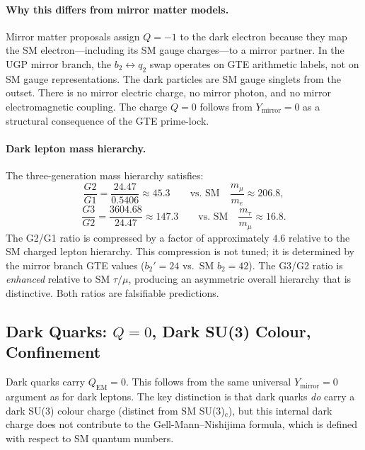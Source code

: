 \documentclass[11pt]{article}
\begin{document}
\paragraph{Why this differs from mirror matter models.}
Mirror matter proposals \cite{FootLewVolkas1991} assign $Q=-1$ to the dark electron
because they map the SM electron---including its SM gauge charges---to a mirror partner.
In the UGP mirror branch, the $b_2 \leftrightarrow q_2$ swap operates on GTE arithmetic
labels, not on SM gauge representations. The dark particles are SM gauge singlets from
the outset. There is no mirror electric charge, no mirror photon, and no mirror
electromagnetic coupling. The charge $Q=0$ follows from $Y_\mathrm{mirror}=0$ as a
structural consequence of the GTE prime-lock.

\paragraph{Dark lepton mass hierarchy.}
The three-generation mass hierarchy satisfies:
\begin{equation}
\frac{G2}{G1} = \frac{24.47}{0.5406} \approx 45.3
\qquad\text{vs.\ SM}\quad \frac{m_\mu}{m_e} \approx 206.8,
\label{eq:mass_ratio_g2g1}
\end{equation}
\begin{equation}
\frac{G3}{G2} = \frac{3604.68}{24.47} \approx 147.3
\qquad\text{vs.\ SM}\quad \frac{m_\tau}{m_\mu} \approx 16.8.
\label{eq:mass_ratio_g3g2}
\end{equation}
The G2/G1 ratio is compressed by a factor of approximately $4.6$ relative to the SM
charged lepton hierarchy. This compression is not tuned; it is determined by the mirror
branch GTE values ($b_2'=24$ vs.\ SM $b_2=42$). The G3/G2 ratio is \emph{enhanced}
relative to SM $\tau/\mu$, producing an asymmetric overall hierarchy that is distinctive.
Both ratios are falsifiable predictions.

\subsection{Dark Quarks: $Q=0$, Dark SU(3) Colour, Confinement}
\label{ssec:dark_quarks}

Dark quarks carry $Q_\mathrm{EM} = 0$. This follows from the same universal
$Y_\mathrm{mirror}=0$ argument as for dark leptons. The key distinction is that dark
quarks \emph{do} carry a dark SU(3) colour charge (distinct from SM SU(3)$_c$), but this
internal dark charge does not contribute to the Gell-Mann--Nishijima formula, which is
defined with respect to SM quantum numbers.
\end{document}
